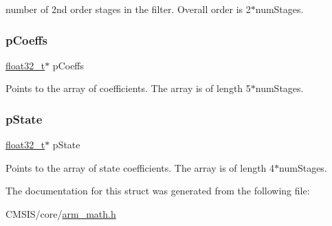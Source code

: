 number of 2nd order stages in the filter. Overall order is 2$\ast$num\+Stages. \mbox{\label{structarm__biquad__casd__df1__inst__f32_aacbb8dd8eeba4b21fc2bb40076405ee3}} 
\subsubsection{\texorpdfstring{pCoeffs}{pCoeffs}}
{\footnotesize\ttfamily \mbox{\hyperlink{arm__math_8h_a4611b605e45ab401f02cab15c5e38715}{float32\+\_\+t}}$\ast$ p\+Coeffs}

Points to the array of coefficients. The array is of length 5$\ast$num\+Stages. \mbox{\label{structarm__biquad__casd__df1__inst__f32_a335c87e6fdc4b96601d95a5de8b9c463}} 
\subsubsection{\texorpdfstring{pState}{pState}}
{\footnotesize\ttfamily \mbox{\hyperlink{arm__math_8h_a4611b605e45ab401f02cab15c5e38715}{float32\+\_\+t}}$\ast$ p\+State}

Points to the array of state coefficients. The array is of length 4$\ast$num\+Stages. 

The documentation for this struct was generated from the following file\+:\begin{DoxyCompactItemize}
\item 
C\+M\+S\+I\+S/core/\mbox{\hyperlink{arm__math_8h}{arm\+\_\+math.\+h}}\end{DoxyCompactItemize}
